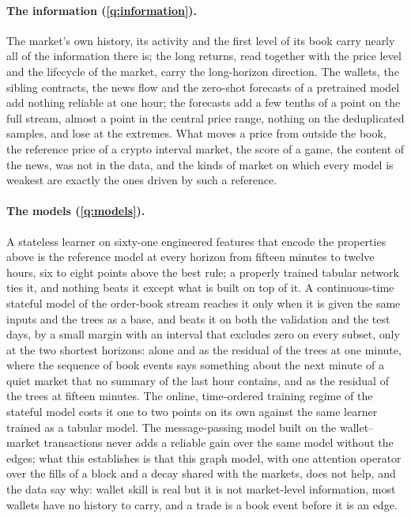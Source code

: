 \paragraph{The information (\ref{q:information}).}  The market's own history, its
activity and the first level of its book carry nearly all of the information there is; the
long returns, read together with the price level and the lifecycle of the market, carry the
long-horizon direction.  The wallets, the sibling contracts, the news flow and the
zero-shot forecasts of a pretrained model add nothing reliable at one hour; the forecasts
add a few tenths of a point on the full stream, almost a point in the central price range,
nothing on the deduplicated samples, and lose at the extremes.  What moves a price from outside the book, the reference price of a crypto
interval market, the score of a game, the content of the news, was not in the data, and the
kinds of market on which every model is weakest are exactly the ones driven by such a
reference.

\paragraph{The models (\ref{q:models}).}  A stateless learner on sixty-one engineered
features that encode the properties above is the reference model at every horizon from
fifteen minutes to twelve hours, six to eight points above the best rule; a properly trained
tabular network ties it, and nothing beats it except what is built on top of it.  A continuous-time stateful model of the order-book stream reaches
it only when it is given the same inputs and the trees as a base, and beats it on both the
validation and the test days, by a small margin with an interval that excludes zero on
every subset, only at the two shortest horizons: alone and as the residual of the trees at one minute, where the sequence of book
events says something about the next minute of a quiet market that no summary of the last
hour contains, and as the residual of the trees at fifteen minutes.  The online, time-ordered training regime of the
stateful model costs it one to two points on its own against the same learner trained as a
tabular model.  The message-passing model built on the wallet--market transactions never
adds a reliable gain over the same model without the edges; what this establishes is that
this graph model, with one attention operator over the fills of a block and a decay shared
with the markets, does not help, and the data say why: wallet skill is real but it is not
market-level information, most wallets have no history to carry, and a trade is a book
event before it is an edge.

